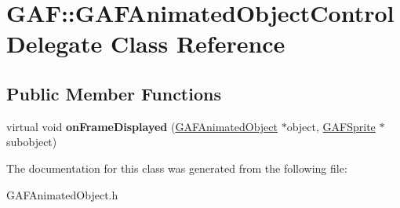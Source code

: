 \hypertarget{class_g_a_f_1_1_g_a_f_animated_object_control_delegate}{\section{G\-A\-F\-:\-:G\-A\-F\-Animated\-Object\-Control\-Delegate Class Reference}
\label{class_g_a_f_1_1_g_a_f_animated_object_control_delegate}
}
\subsection*{Public Member Functions}
\begin{DoxyCompactItemize}
\item 
\hypertarget{class_g_a_f_1_1_g_a_f_animated_object_control_delegate_a406482512ed787c197c333afe5b21164}{virtual void {\bfseries on\-Frame\-Displayed} (\hyperlink{class_g_a_f_1_1_g_a_f_animated_object}{G\-A\-F\-Animated\-Object} $\ast$object, \hyperlink{class_g_a_f_1_1_g_a_f_sprite}{G\-A\-F\-Sprite} $\ast$subobject)}\label{class_g_a_f_1_1_g_a_f_animated_object_control_delegate_a406482512ed787c197c333afe5b21164}

\end{DoxyCompactItemize}


The documentation for this class was generated from the following file\-:\begin{DoxyCompactItemize}
\item 
G\-A\-F\-Animated\-Object.\-h\end{DoxyCompactItemize}
